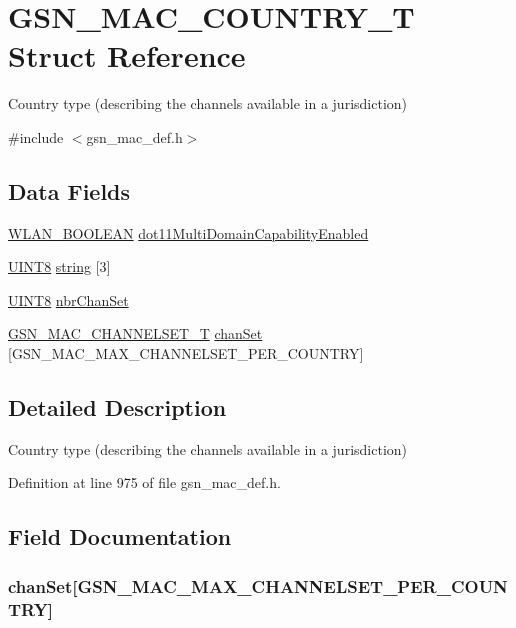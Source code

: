 \hypertarget{a00115}{
\section{GSN\_\-MAC\_\-COUNTRY\_\-T Struct Reference}
\label{a00115}
}


Country type (describing the channels available in a jurisdiction)  




{\ttfamily \#include $<$gsn\_\-mac\_\-def.h$>$}

\subsection*{Data Fields}
\begin{DoxyCompactItemize}
\item 
\hyperlink{a00642_ga7fb691c78d3a1046fa998bae1560e1a5}{WLAN\_\-BOOLEAN} \hyperlink{a00115_a0080f72238617c44abf6caf1da8afbb9}{dot11MultiDomainCapabilityEnabled}
\item 
\hyperlink{a00660_gab27e9918b538ce9d8ca692479b375b6a}{UINT8} \hyperlink{a00115_a1efe6cde196e8248cee98f71f7562141}{string} \mbox{[}3\mbox{]}
\item 
\hyperlink{a00660_gab27e9918b538ce9d8ca692479b375b6a}{UINT8} \hyperlink{a00115_a4cf3b775df0be874a70aa4a8e6b529a7}{nbrChanSet}
\item 
\hyperlink{a00114}{GSN\_\-MAC\_\-CHANNELSET\_\-T} \hyperlink{a00115_a816cfa90c0f176196983d858e2d722b9}{chanSet} \mbox{[}GSN\_\-MAC\_\-MAX\_\-CHANNELSET\_\-PER\_\-COUNTRY\mbox{]}
\end{DoxyCompactItemize}


\subsection{Detailed Description}
Country type (describing the channels available in a jurisdiction) 

Definition at line 975 of file gsn\_\-mac\_\-def.h.



\subsection{Field Documentation}
\hypertarget{a00115_a816cfa90c0f176196983d858e2d722b9}{
\subsubsection[{chanSet}]{ {\bf chanSet}\mbox{[}GSN\_\-MAC\_\-MAX\_\-CHANNELSET\_\-PER\_\-COUNTRY\mbox{]}}}
\label{a00115_a816cfa90c0f176196983d858e2d722b9}


